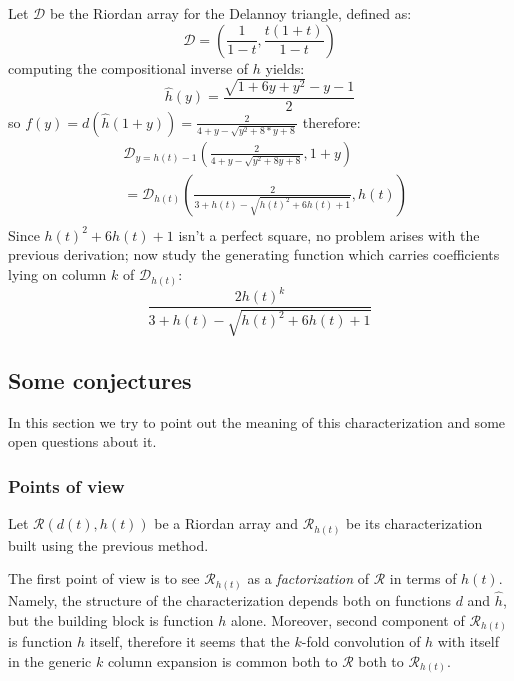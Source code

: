 \documentclass[11pt,a4paper]{article} %
\begin{document}
    Let $\mathcal{D}$ be the Riordan array for the Delannoy triangle, defined as:
    \begin{displaymath} 
        \mathcal{D} =\left( \frac{1}{1-t}, \frac{t(1+t)}{1-t}  \right)
    \end{displaymath} 
    computing the compositional inverse of $h$ yields:
    \begin{displaymath} 
        \hat{h}(y) = \frac{\sqrt{1+6y+y^2}-y-1}{2}
    \end{displaymath} 
    so $f(y)=d(\hat{h}(1+y))=\frac{2}{4 + y - \sqrt{y^2 + 8*y + 8} }$ therefore:
    \begin{displaymath} 
        \begin{split}
            & \mathcal{D}_{y=h(t)-1}\left( \frac{2}{4+y-\sqrt{y^2+8y+8}}, 1+y \right)\\
            &= \mathcal{D}_{h(t)}\left( \frac{2}{3+h(t)-\sqrt{h(t)^2+6h(t)+1}}, h(t) \right) \\
        \end{split}
    \end{displaymath} 
    Since $h(t)^2+6h(t)+1$ isn't a perfect square, no problem arises with the previous
    derivation; now study the generating function which carries coefficients lying on column $k$
    of $\mathcal{D}_{h(t)}$:
    \begin{displaymath} 
        \frac{2h(t)^k}{3+h(t)-\sqrt{h(t)^2+6h(t)+1}}
    \end{displaymath} 

    \subsection{Some conjectures}

    In this section we try to point out the meaning of this characterization
    and some open questions about it.

    \subsubsection{Points of view}

    Let $\mathcal{R}\left(d(t),h(t)\right)$ be a Riordan array and $\mathcal{R}_{h(t)}$ be
    its characterization built using the previous method.
    
    The first point of view is to see $\mathcal{R}_{h(t)}$ as a \emph{factorization}
    of $\mathcal{R}$ in terms of $h(t)$. Namely, the structure of the characterization
    depends both on functions $d$ and $\hat{h}$, but the building block is function $h$
    alone. Moreover, second component of $\mathcal{R}_{h(t)}$ is function $h$ itself,
    therefore it seems that the $k$-fold convolution of $h$ with itself in the generic
    $k$ column expansion is common both to $\mathcal{R}$ both to $\mathcal{R}_{h(t)}$.
\end{document}
